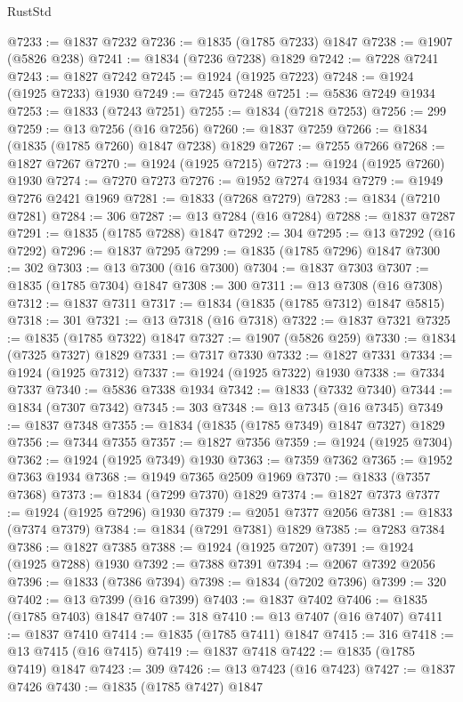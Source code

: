 \begin{lexlean}{RustStd}
\begin{coremodule}
@7233 := @1837 @7232
@7236 := @1835 (@1785 @7233) @1847
@7238 := @1907 (@5826 @238)
@7241 := @1834 (@7236 @7238) @1829
@7242 := @7228 @7241
@7243 := @1827 @7242
@7245 := @1924 (@1925 @7223)
@7248 := @1924 (@1925 @7233) @1930
@7249 := @7245 @7248
@7251 := @5836 @7249 @1934
@7253 := @1833 (@7243 @7251)
@7255 := @1834 (@7218 @7253)
@7256 := 299
@7259 := @13 @7256 (@16 @7256)
@7260 := @1837 @7259
@7266 := @1834 (@1835 (@1785 @7260) @1847 @7238) @1829
@7267 := @7255 @7266
@7268 := @1827 @7267
@7270 := @1924 (@1925 @7215)
@7273 := @1924 (@1925 @7260) @1930
@7274 := @7270 @7273
@7276 := @1952 @7274 @1934
@7279 := @1949 @7276 @2421 @1969
@7281 := @1833 (@7268 @7279)
@7283 := @1834 (@7210 @7281)
@7284 := 306
@7287 := @13 @7284 (@16 @7284)
@7288 := @1837 @7287
@7291 := @1835 (@1785 @7288) @1847
@7292 := 304
@7295 := @13 @7292 (@16 @7292)
@7296 := @1837 @7295
@7299 := @1835 (@1785 @7296) @1847
@7300 := 302
@7303 := @13 @7300 (@16 @7300)
@7304 := @1837 @7303
@7307 := @1835 (@1785 @7304) @1847
@7308 := 300
@7311 := @13 @7308 (@16 @7308)
@7312 := @1837 @7311
@7317 := @1834 (@1835 (@1785 @7312) @1847 @5815)
@7318 := 301
@7321 := @13 @7318 (@16 @7318)
@7322 := @1837 @7321
@7325 := @1835 (@1785 @7322) @1847
@7327 := @1907 (@5826 @259)
@7330 := @1834 (@7325 @7327) @1829
@7331 := @7317 @7330
@7332 := @1827 @7331
@7334 := @1924 (@1925 @7312)
@7337 := @1924 (@1925 @7322) @1930
@7338 := @7334 @7337
@7340 := @5836 @7338 @1934
@7342 := @1833 (@7332 @7340)
@7344 := @1834 (@7307 @7342)
@7345 := 303
@7348 := @13 @7345 (@16 @7345)
@7349 := @1837 @7348
@7355 := @1834 (@1835 (@1785 @7349) @1847 @7327) @1829
@7356 := @7344 @7355
@7357 := @1827 @7356
@7359 := @1924 (@1925 @7304)
@7362 := @1924 (@1925 @7349) @1930
@7363 := @7359 @7362
@7365 := @1952 @7363 @1934
@7368 := @1949 @7365 @2509 @1969
@7370 := @1833 (@7357 @7368)
@7373 := @1834 (@7299 @7370) @1829
@7374 := @1827 @7373
@7377 := @1924 (@1925 @7296) @1930
@7379 := @2051 @7377 @2056
@7381 := @1833 (@7374 @7379)
@7384 := @1834 (@7291 @7381) @1829
@7385 := @7283 @7384
@7386 := @1827 @7385
@7388 := @1924 (@1925 @7207)
@7391 := @1924 (@1925 @7288) @1930
@7392 := @7388 @7391
@7394 := @2067 @7392 @2056
@7396 := @1833 (@7386 @7394)
@7398 := @1834 (@7202 @7396)
@7399 := 320
@7402 := @13 @7399 (@16 @7399)
@7403 := @1837 @7402
@7406 := @1835 (@1785 @7403) @1847
@7407 := 318
@7410 := @13 @7407 (@16 @7407)
@7411 := @1837 @7410
@7414 := @1835 (@1785 @7411) @1847
@7415 := 316
@7418 := @13 @7415 (@16 @7415)
@7419 := @1837 @7418
@7422 := @1835 (@1785 @7419) @1847
@7423 := 309
@7426 := @13 @7423 (@16 @7423)
@7427 := @1837 @7426
@7430 := @1835 (@1785 @7427) @1847

\end{coremodule}
\end{lexlean}
